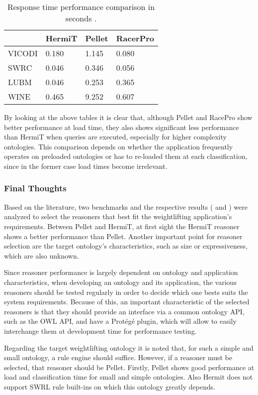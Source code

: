 \begin{table}[]
\centering
\caption{Response time performance comparison in seconds \cite{Bock2008}.}
\begin{tabular}{|l|l|l|l|}
\hline
          &  HermiT  &  Pellet  & RacerPro \\ \hline
VICODI    &    0.180  &  1.145  & 0.080 \\ \hline
SWRC      &    0.046  &  0.346  & 0.056 \\ \hline
LUBM      &    0.046  &  0.253  & 0.365 \\ \hline
WINE      &    0.465  &  9.252  & 0.607 \\ \hline
\end{tabular}
\label{tab:4}
\end{table}

By looking at the above tables it is clear that, although Pellet and RacePro show better performance at load time, they also shows significant less performance than HermiT when queries are executed, especially for higher complexity ontologies. This comparison depends on whether the application frequently operates on preloaded ontologies or has to re-loaded them at each classification, since in the former case load times become irrelevant. 


\subsubsection{Final Thoughts}

Based on the literature, two benchmarks and the respective results (\cite{Dentler2011} and \cite{Bock2008}) were analyzed to select the reasoners that best fit the weightlifting application's requirements. Between Pellet and HermiT, at first sight the HermiT reasoner shows a better performance than Pellet.  Another important point for reasoner selection are the target ontology's characteristics, such as size or expressiveness, which are also unknown. 

Since reasoner performance is largely dependent on ontology and application characteristics, when developing an ontology and its application, the various reasoners should be tested regularly in order to decide which one bests suits the system requirements. Because of this, an important characteristic of the selected reasoners is that they should provide an interface via a common ontology API, such as the OWL API, and have a Protégé plugin, which will allow to easily interchange them at development time for performance testing. 

Regarding the target weightlifting ontology it is noted that, for such a simple and small ontology, a rule engine should suffice. However, if a reasoner must be selected, that reasoner should be Pellet. Firstly, Pellet shows good performance at load and classification time for small and simple ontologies. Also Hermit does not support SWRL rule built-ins on which this ontology greatly depends.
